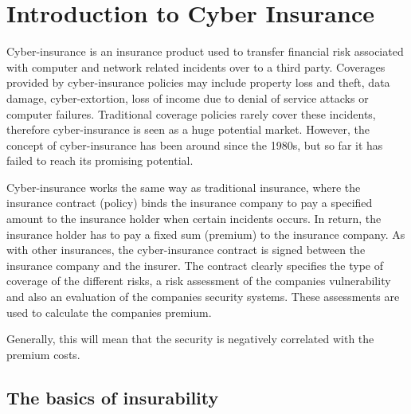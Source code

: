 \chapter{Introduction to Cyber Insurance}
\label{chp:introductionToCyberInsurance} 

Cyber-insurance is an insurance product used to transfer financial risk
associated with computer and network related incidents over to a third party.
 Coverages provided by cyber-insurance policies may include property loss and
theft, data damage, cyber-extortion, loss of income due to denial of service attacks or computer failures. \cite{washingtonpaper}
Traditional coverage policies rarely cover these incidents, therefore cyber-insurance is seen as a huge potential market. However, the concept of cyber-insurance has been around since the 1980s, but so far it has failed to reach its promising potential. 
  
 

Cyber-insurance works the same way as traditional insurance, where the insurance contract (policy)
 binds the insurance company to pay a specified amount to the insurance holder when certain incidents
  occurs. In return, the insurance holder has to pay a fixed sum (premium) to the insurance company.
   \cite{robinson2012incentives}
    As with other insurances, the cyber-insurance contract is signed between the insurance company and
     the insurer. The contract clearly specifies the type of coverage of the different risks, a risk
      assessment of the companies vulnerability and also an evaluation of the companies security
       systems. These assessments are used to calculate the companies premium.


 \cite{robinson2012incentives} Generally, this will mean that the security is negatively correlated with the premium costs.  


\section{The basics of insurability}

